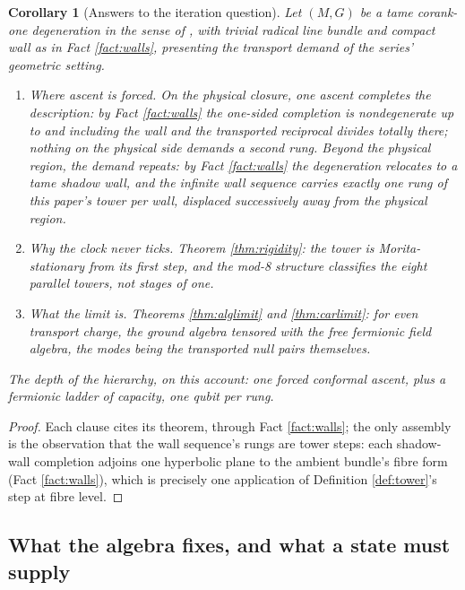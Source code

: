\documentclass[11pt]{article}
\newtheorem{corollary}[theorem]{Corollary}
\theoremstyle{definition}
\begin{document}
\begin{corollary}[Answers to the iteration question]\label{cor:iteration}
Let $(M, G)$ be a tame corank-one degeneration in the sense of \cite[Hyp.~2.1]{ButlerT4}, with trivial radical line bundle and compact wall as in Fact \ref{fact:walls}, presenting the transport demand of the series' geometric setting.
\begin{enumerate}
\item \emph{Where ascent is forced.} On the physical closure, one ascent completes the description: by Fact \ref{fact:walls} the one-sided completion is nondegenerate up to and including the wall and the transported reciprocal divides totally there; nothing on the physical side demands a second rung. Beyond the physical region, the demand repeats: by Fact \ref{fact:walls} the degeneration relocates to a tame shadow wall, and the infinite wall sequence carries exactly one rung of this paper's tower per wall, displaced successively away from the physical region.
\item \emph{Why the clock never ticks.} Theorem \ref{thm:rigidity}: the tower is Morita-stationary from its first step, and the mod-8 structure classifies the eight parallel towers, not stages of one.
\item \emph{What the limit is.} Theorems \ref{thm:alglimit} and \ref{thm:carlimit}: for even transport charge, the ground algebra tensored with the free fermionic field algebra, the modes being the transported null pairs themselves.
\end{enumerate}
The depth of the hierarchy, on this account: one forced conformal ascent, plus a fermionic ladder of capacity, one qubit per rung.
\end{corollary}

\begin{proof}
Each clause cites its theorem, through Fact \ref{fact:walls}; the only assembly is the observation that the wall sequence's rungs are tower steps: each shadow-wall completion adjoins one hyperbolic plane to the ambient bundle's fibre form (Fact \ref{fact:walls}), which is precisely one application of Definition \ref{def:tower}'s step at fibre level.
\end{proof}

\subsection{What the algebra fixes, and what a state must supply}\label{subsec:fixes}
\end{document}
